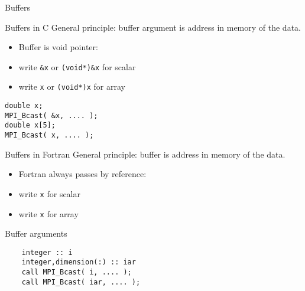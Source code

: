 
\begin{exerciseframe}[randommax]
  
\end{exerciseframe}

 {Buffers}

\begin{c}
\begin{numberedframe}{Buffers in C}
  General principle: buffer argument is address in memory of the data.
  \begin{itemize}
  \item Buffer is void pointer: 
  \item write \lstinline{&x} or \lstinline{(void*)&x} for scalar
  \item write \lstinline{x} or \lstinline{(void*)x} for array
  \end{itemize}
\begin{lstlisting}
double x;
MPI_Bcast( &x, .... );
double x[5];
MPI_Bcast( x, .... );
\end{lstlisting}
\end{numberedframe}
\end{c}

\begin{fortran}
  \addtocounter{slidecount}{-1}
\begin{numberedframe}{Buffers in Fortran}
  General principle: buffer is address in memory of the data.
  \begin{itemize}
  \item Fortran always passes by reference:
  \item write \lstinline{x} for scalar
  \item write \lstinline{x} for array
  \end{itemize}
\end{numberedframe}
\begin{numberedframe}{Buffer arguments}
  \begin{lstlisting}
    integer :: i
    integer,dimension(:) :: iar
    call MPI_Bcast( i, .... );
    call MPI_Bcast( iar, .... );
  \end{lstlisting}
\end{numberedframe}
\end{fortran}

